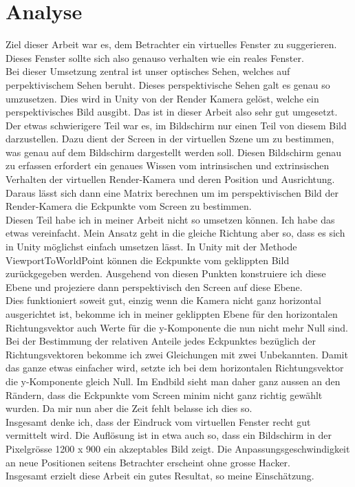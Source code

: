 \section{Analyse}
Ziel dieser Arbeit war es, dem Betrachter ein virtuelles Fenster zu suggerieren. Dieses Fenster sollte sich also genauso verhalten wie ein reales Fenster. \\ Bei dieser Umsetzung zentral ist  unser optisches Sehen, welches auf perpektivischem Sehen beruht. Dieses perspektivische Sehen galt es genau so umzusetzen. Dies wird in Unity von der Render Kamera gelöst, welche ein perspektivisches Bild ausgibt. Das ist in dieser Arbeit also sehr gut umgesetzt. \\ Der etwas schwierigere Teil war es, im Bildschirm  nur einen Teil von diesem Bild darzustellen. Dazu dient der Screen in der virtuellen Szene um zu bestimmen, was genau auf dem  Bildschirm dargestellt werden soll. Diesen Bildschirm genau zu erfassen erfordert ein genaues Wissen vom intrinsischen und extrinsischen Verhalten der virtuellen Render-Kamera und deren Position und Ausrichtung. \\
Daraus lässt sich dann eine Matrix berechnen um im perspektivischen Bild der Render-Kamera die Eckpunkte vom Screen zu bestimmen. \\ Diesen Teil habe ich in meiner Arbeit nicht so umsetzen können. Ich habe das etwas vereinfacht. Mein Ansatz geht in die gleiche Richtung aber so, dass es sich in Unity möglichst einfach umsetzen lässt. In Unity mit der Methode ViewportToWorldPoint können die Eckpunkte vom geklippten Bild zurückgegeben werden. Ausgehend von diesen Punkten konstruiere ich diese Ebene und projeziere dann perspektivisch den Screen auf diese Ebene. \\ Dies funktioniert soweit gut, einzig wenn die Kamera nicht ganz horizontal ausgerichtet ist, bekomme ich in meiner geklippten Ebene für den horizontalen Richtungsvektor auch Werte für die y-Komponente die nun nicht mehr Null sind. \\ Bei der Bestimmung der relativen Anteile jedes Eckpunktes bezüglich der Richtungsvektoren bekomme ich zwei Gleichungen mit zwei Unbekannten. Damit das ganze etwas einfacher wird, setzte ich bei dem horizontalen Richtungsvektor die y-Komponente gleich Null. Im Endbild sieht man daher ganz aussen an den Rändern, dass die Eckpunkte vom Screen minim nicht ganz richtig gewählt wurden. Da mir nun aber die Zeit fehlt belasse ich dies so. \\ Insgesamt denke ich, dass der Eindruck vom virtuellen Fenster recht gut vermittelt wird. Die Auflösung ist in etwa auch so, dass ein Bildschirm in der Pixelgrösse 1200 x 900 ein akzeptables Bild zeigt. Die Anpassungsgeschwindigkeit an neue Positionen seitens Betrachter erscheint ohne grosse Hacker. \\ Insgesamt erzielt diese Arbeit ein gutes Resultat, so meine Einschätzung.